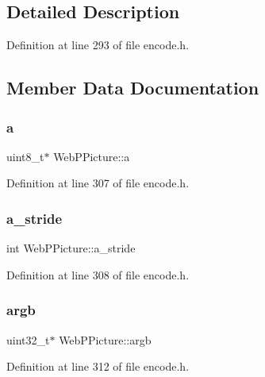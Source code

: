 

\subsection{Detailed Description}


Definition at line 293 of file encode.\+h.



\subsection{Member Data Documentation}
\mbox{\label{struct_web_p_picture_a9ba92e4968230d840da0acbf48f6f2fb}} 
\subsubsection{\texorpdfstring{a}{a}}
{\footnotesize\ttfamily uint8\+\_\+t$\ast$ Web\+P\+Picture\+::a}



Definition at line 307 of file encode.\+h.

\mbox{\label{struct_web_p_picture_a02c5a78d2e29327439d258a47afd036a}} 
\subsubsection{\texorpdfstring{a\_stride}{a\_stride}}
{\footnotesize\ttfamily int Web\+P\+Picture\+::a\+\_\+stride}



Definition at line 308 of file encode.\+h.

\mbox{\label{struct_web_p_picture_a69213b56a4eb3894d9b3bdeabce7c956}} 
\subsubsection{\texorpdfstring{argb}{argb}}
{\footnotesize\ttfamily uint32\+\_\+t$\ast$ Web\+P\+Picture\+::argb}



Definition at line 312 of file encode.\+h.

\mbox{\label{struct_web_p_picture_ac955e0d373548f0c541feb2485c0c13a}} 
